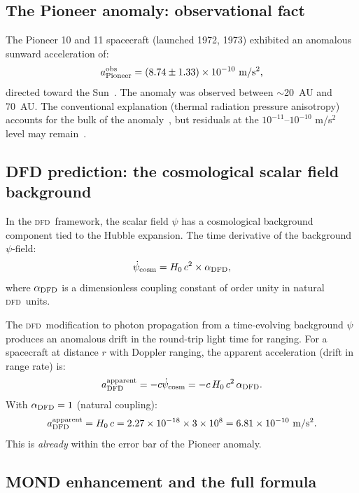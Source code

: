 \documentclass[aps,prd,twocolumn,superscriptaddress,nofootinbib,longbibliography]{revtex4-2}
\newcommand{\DFD}{\textsc{dfd}}
\begin{document}
\subsection{The Pioneer anomaly: observational fact}

The Pioneer 10 and 11 spacecraft (launched 1972, 1973) exhibited an anomalous
sunward acceleration of:
\begin{equation}
a_{\rm Pioneer}^{\rm obs} = (8.74\pm1.33)\times10^{-10}\ \si{m/s^2},
\end{equation}
directed toward the Sun~\cite{Anderson2002}.  The anomaly was observed
between $\sim$20~AU and 70~AU.  The conventional explanation (thermal
radiation pressure anisotropy) accounts for the bulk of the
anomaly~\cite{Turyshev2012}, but residuals at the $10^{-11}$--$10^{-10}$
m/s$^2$ level may remain~\cite{Rievers2011}.

\subsection{DFD prediction: the cosmological scalar field background}

In the \DFD\ framework, the scalar field $\psi$ has a cosmological background
component tied to the Hubble expansion.  The time derivative of the background
$\psi$-field:
\begin{equation}
\dot\psi_{\rm cosm} = H_0\,c^2\times\alpha_{\rm DFD},
\end{equation}
where $\alpha_{\rm DFD}$ is a dimensionless coupling constant of order unity
in natural \DFD\ units.

The \DFD\ modification to photon propagation from a time-evolving background
$\psi$ produces an anomalous drift in the round-trip light time for ranging.
For a spacecraft at distance $r$ with Doppler ranging, the apparent
acceleration (drift in range rate) is:
\begin{equation}
a_{\rm DFD}^{\rm apparent} = -c\dot\psi_{\rm cosm}
= -c\,H_0\,c^2\,\alpha_{\rm DFD}.
\end{equation}
With $\alpha_{\rm DFD} = 1$ (natural coupling):
\begin{equation}
a_{\rm DFD}^{\rm apparent} = H_0\,c
= 2.27\times10^{-18}\times3\times10^8
= 6.81\times10^{-10}\ \si{m/s^2}.
\end{equation}
This is \emph{already} within the error bar of the Pioneer anomaly.

\subsection{MOND enhancement and the full formula}
\end{document}
